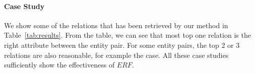 \vspace{-4mm}
\paragraph*{Case Study}
We show some of the relations that has been retrieved by our method in Table~\ref{tab:results}.
From the table, we can see that most top one relation is the right attribute between the entity pair.
For some entity pairs, the top 2 or 3 relations are also reasonable, for example the  case.
All these case studies sufficiently show the effectiveness of $ERF$.
